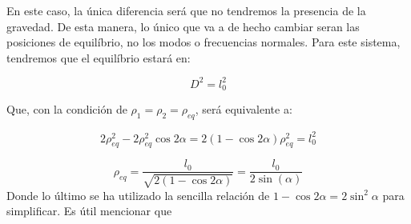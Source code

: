 \documentclass[a4paper,12pt]{article}
\begin{document}
En este caso, la única diferencia será que no tendremos la presencia de la gravedad. De esta manera, lo único que va a de hecho cambiar seran las posiciones de equilíbrio, no los modos o frecuencias normales. Para este sistema, tendremos que el equilíbrio estará en:

$$D^2 = l_0^2$$

Que, con la condición de $\rho_1= \rho_2 = \rho_{eq}$, será equivalente a:

$$2\rho_{eq}^2 - 2\rho_{eq}^2 \cos{2\alpha} = 2(1-\cos{2\alpha}) \rho_{eq}^2 = l_0^2$$

\begin{equation}
\rho_{eq} = \frac{l_0}{\sqrt{2(1-\cos{2\alpha})}} = \frac{l_0}{2\sin(\alpha)}
\end{equation}
Donde lo último se ha utilizado la sencilla relación de $1-\cos{2\alpha} = 2\sin^2{\alpha}$ para simplificar. Es útil mencionar que 
\end{document}
